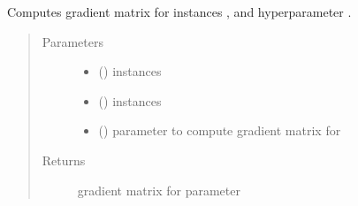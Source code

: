 \documentclass[letterpaper,10pt,english]{sphinxmanual}
\begin{document}
\begin{fulllineitems}
\begin{fulllineitems}
\label{\detokenize{index:bo.covfunc.SquaredExponential.grad_matrix}}
Computes gradient matrix for instances ,  and hyperparameter .
\begin{quote}\begin{description}
\item[{Parameters}] \leavevmode\begin{itemize}
\item {} 
 (\sphinxstyleliteralemphasis{, }\sphinxstyleliteralemphasis{(}\sphinxstyleliteralemphasis{(}\sphinxstyleliteralemphasis{, }\sphinxstyleliteralemphasis{)}\sphinxstyleliteralemphasis{)}) \textendash{} instances

\item {} 
 (\sphinxstyleliteralemphasis{, }\sphinxstyleliteralemphasis{(}\sphinxstyleliteralemphasis{(}\sphinxstyleliteralemphasis{, }\sphinxstyleliteralemphasis{)}\sphinxstyleliteralemphasis{)}) \textendash{} instances

\item {} 
 () \textendash{} parameter to compute gradient matrix for

\end{itemize}

\item[{Returns}] \leavevmode
gradient matrix for parameter 

\end{description}\end{quote}

\end{fulllineitems}


\end{fulllineitems}

\end{document}

